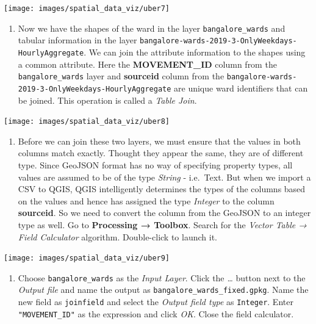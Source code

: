 \documentclass[
  12pt,
  a4paper]{article}
\providecommand{\tightlist}{%
  \setlength{\itemsep}{0pt}\setlength{\parskip}{0pt}}
\begin{document}
\begin{center}\texttt{[image: images/spatial\_data\_viz/uber7]} \end{center}

\begin{enumerate}
\def\labelenumi{\arabic{enumi}.}
\setcounter{enumi}{7}
\tightlist
\item
  Now we have the shapes of the ward in the layer
  \texttt{bangalore\_wards} and tabular information in the layer
  \texttt{bangalore-wards-2019-3-OnlyWeekdays-HourlyAggregate}. We can
  join the attribute information to the shapes using a common attribute.
  Here the \textbf{MOVEMENT\_ID} column from the
  \texttt{bangalore\_wards} layer and \textbf{sourceid} column from the
  \texttt{bangalore-wards-2019-3-OnlyWeekdays-HourlyAggregate} are
  unique ward identifiers that can be joined. This operation is called a
  \emph{Table Join}.
\end{enumerate}

\begin{center}\texttt{[image: images/spatial\_data\_viz/uber8]} \end{center}

\begin{enumerate}
\def\labelenumi{\arabic{enumi}.}
\setcounter{enumi}{8}
\tightlist
\item
  Before we can join these two layers, we must ensure that the values in
  both columns match exactly. Thought they appear the same, they are of
  different type. Since GeoJSON format has no way of specifying property
  types, all values are assumed to be of the type \emph{String} -
  i.e.~Text. But when we import a CSV to QGIS, QGIS intelligently
  determines the types of the columns based on the values and hence has
  assigned the type \emph{Integer} to the column \textbf{sourceid}. So
  we need to convert the column from the GeoJSON to an integer type as
  well. Go to \textbf{Processing → Toolbox}. Search for the \emph{Vector
  Table → Field Calculator} algorithm. Double-click to launch it.
\end{enumerate}

\begin{center}\texttt{[image: images/spatial\_data\_viz/uber9]} \end{center}

\begin{enumerate}
\def\labelenumi{\arabic{enumi}.}
\setcounter{enumi}{9}
\tightlist
\item
  Choose \texttt{bangalore\_wards} as the \emph{Input Layer}. Click the
  \emph{\ldots{}} button next to the \emph{Output file} and name the
  output as \texttt{bangalore\_wards\_fixed.gpkg}. Name the new field as
  \texttt{joinfield} and select the \emph{Output field type} as
  \texttt{Integer}. Enter \texttt{"MOVEMENT\_ID"} as the expression and
  click \emph{OK}. Close the field calculator.
\end{enumerate}
\end{document}
